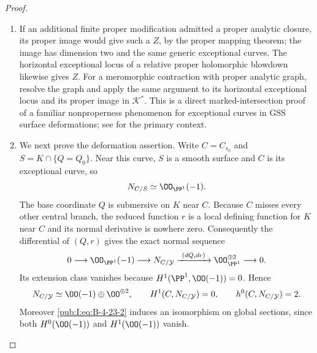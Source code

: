 \begin{proof}
\begin{enumerate}[label=\arabic*.,leftmargin=*]
\item If an additional finite proper modification admitted a
proper analytic closure, its proper image would give
such a $Z$, by the proper mapping theorem; the image has
dimension two and the same generic exceptional curves.
The horizontal exceptional locus of a relative proper
holomorphic blowdown likewise gives $Z$. For a meromorphic
contraction with proper analytic graph, resolve the graph
and apply the same argument to its horizontal exceptional
locus and its proper image in $\mathcal K^*$.
This is a direct marked-intersection proof of a familiar
nonproperness phenomenon for exceptional curves in GSS
surface deformations; see
\citet[arXiv version~2, Section~1.2, PDF pp.~3--5]{DlousskyTeleman2012AB} for the primary
context.

\item We next prove the deformation assertion. Write
$C=C_{s_0}$ and $S=K\cap\{Q=Q_0\}$. Near this curve,
$S$ is a smooth surface and $C$ is its exceptional curve,
so
\[
 N_{C/S}\simeq\OO_{\PP^1}(-1).
\]
The base coordinate $Q$ is submersive on $K$ near $C$.
Because $C$ misses every other central branch, the reduced
function $r$ is a local defining function for $K$ near
$C$ and its normal derivative is nowhere zero.
Consequently the differential of $(Q,r)$ gives the exact
normal sequence
\begin{equation}
 0\longrightarrow\OO_{\PP^1}(-1)
 \longrightarrow N_{C/\mathcal Y}
 \xrightarrow{\ (dQ,dr)\ }
 \OO_{\PP^1}^{\oplus2}\longrightarrow0.
\label{pub:I:eq:B-4-23-2}
\end{equation}
Its extension class vanishes because
$H^1(\PP^1,\OO(-1))=0$. Hence
\begin{equation}
 N_{C/\mathcal Y}\simeq
 \OO(-1)\oplus\OO^{\oplus2},\qquad
 H^1(C,N_{C/\mathcal Y})=0,\qquad
 h^0(C,N_{C/\mathcal Y})=2.
\label{pub:I:eq:B-4-23-3}
\end{equation}
Moreover \eqref{pub:I:eq:B-4-23-2} induces an isomorphism on global
sections, since both $H^0(\OO(-1))$ and $H^1(\OO(-1))$
vanish.


\end{enumerate}
\end{proof}
